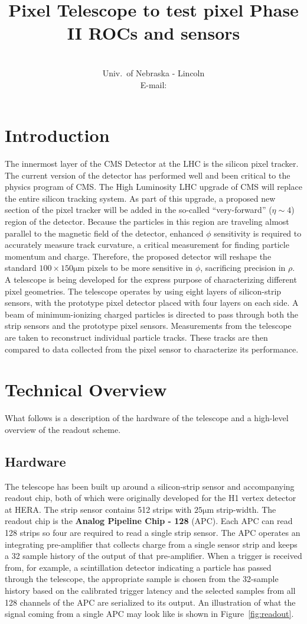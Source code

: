 \documentclass{PoS}
\title{Pixel Telescope to test pixel Phase II ROCs and sensors}
\author{\speaker{Caleb Fangmeier}\\
  Univ.\ of Nebraska \-- Lincoln\\
  E-mail: \email{cfangmei@cern.ch}}
\newcommand{\micron}{\si{\micro\meter}}
\begin{document}
\section{Introduction}

The innermost layer of the CMS Detector at the LHC is the silicon pixel
tracker. The current version of the detector has performed well and been
critical to the physics program of CMS. The High Luminosity LHC upgrade of CMS
will replace the entire silicon tracking system.  As part of this upgrade, a
proposed new section of the pixel tracker will be added in the so-called
``very-forward'' ($\eta\sim4$) region of the detector. Because the particles in
this region are traveling almost parallel to the magnetic field of the
detector, enhanced $\phi$ sensitivity is required to accurately measure track
curvature, a critical measurement for finding particle momentum and charge.
Therefore, the proposed detector will reshape the standard
$100\times150\micron$ pixels to be more sensitive in $\phi$, sacrificing
precision in $\rho$. A telescope is being developed for the express purpose of
characterizing different pixel geometries.  The telescope operates by using
eight layers of silicon-strip sensors, with the prototype pixel detector placed
with four layers on each side. A beam of minimum-ionizing charged particles is
directed to pass through both the strip sensors and the prototype pixel
sensors.  Measurements from the telescope are taken to reconstruct individual
particle tracks. These tracks are then compared to data collected from the
pixel sensor to characterize its performance.

\section{Technical Overview}
What follows is a description of the hardware of the telescope and a
high-level overview of the readout scheme.
\subsection{Hardware}
The telescope has been built up around a silicon-strip sensor and accompanying
readout chip, both of which were originally developed for the H1 vertex
detector at HERA\cite{Hilgers2001}. The strip sensor contains 512 strips with
$25\micron$ strip-width. The readout chip is the {\bf Analog Pipeline Chip \-- 128} (APC).
Each APC can read 128 strips so four are required to read a single strip
sensor. The APC operates an integrating pre-amplifier that collects charge from
a single sensor strip and keeps a 32 sample history of the output of that
pre-amplifier. When a trigger is received from, for example, a scintillation
detector indicating a particle has passed through the telescope, the
appropriate sample is chosen from the 32-sample history based on the calibrated
trigger latency and the selected samples from all 128 channels of the APC are
serialized to its output. An illustration of what the signal coming from a
single APC may look like is shown in Figure~\ref{fig:readout}. 
\end{document}
